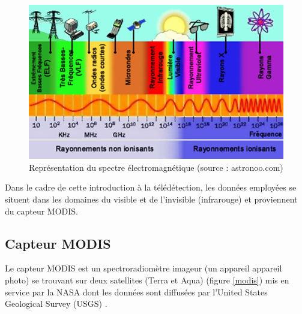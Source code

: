\documentclass[10pt,a4paper]{article}
\begin{document}
\begin{figure}[!h]
\centering
\includegraphics[scale=0.6]{img/spectre-electromagnetique.png}
\caption{Représentation du spectre électromagnétique (source : astronoo.com)}
\label{spectreElectro}
\end{figure}

Dans le cadre de cette introduction à la télédétection, les données employées se situent dans les domaines du visible et de l'invisible (infrarouge) et proviennent du capteur MODIS.

\subsection{Capteur MODIS}

Le capteur MODIS est un spectroradiomètre imageur (un appareil appareil photo) se trouvant sur deux satellites (Terra et Aqua) (figure \ref{modis}) mis en service par la NASA dont les données sont diffusées par l'United States Geological Survey (USGS) .
\end{document}

